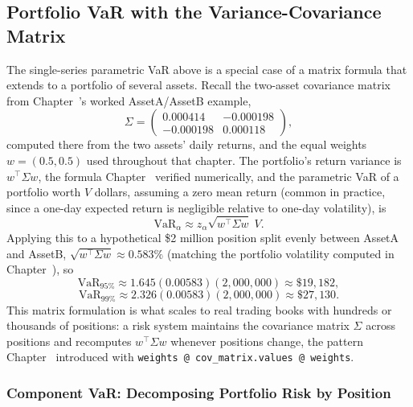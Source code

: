 \documentclass[../ai_in_finance]{subfiles}
\begin{document}
\subsection{Portfolio VaR with the Variance-Covariance Matrix}
\label{sec:matrix-var}

The single-series parametric VaR above is a special case of a matrix formula that extends to a portfolio of several assets. Recall the two-asset covariance matrix from Chapter~'s worked AssetA/AssetB example,
\begin{equation*}
\Sigma = \begin{pmatrix} 0.000414 & -0.000198 \\ -0.000198 & 0.000118 \end{pmatrix},
\end{equation*}
computed there from the two assets' daily returns, and the equal weights $w = (0.5, 0.5)$ used throughout that chapter. The portfolio's return variance is $w^\top \Sigma w$, the formula Chapter~ verified numerically, and the parametric VaR of a portfolio worth $V$ dollars, assuming a zero mean return (common in practice, since a one-day expected return is negligible relative to one-day volatility), is
\begin{equation}
\label{eq:marketrisk-portfolio-var}
\text{VaR}_\alpha \approx z_\alpha \sqrt{w^\top \Sigma w}\; V.
\end{equation}
Applying this to a hypothetical \$2 million position split evenly between AssetA and AssetB, $\sqrt{w^\top \Sigma w} \approx 0.583\%$ (matching the portfolio volatility computed in Chapter~), so
\begin{equation*}
\text{VaR}_{95\%} \approx 1.645(0.00583)(2{,}000{,}000) \approx \$19{,}182,
\end{equation*}
\begin{equation*}
\text{VaR}_{99\%} \approx 2.326(0.00583)(2{,}000{,}000) \approx \$27{,}130.
\end{equation*}
This matrix formulation is what scales to real trading books with hundreds or thousands of positions: a risk system maintains the covariance matrix $\Sigma$ across positions and recomputes $w^\top \Sigma w$ whenever positions change, the pattern Chapter~ introduced with \texttt{weights @ cov\_matrix.values @ weights}.

\subsubsection*{Component VaR: Decomposing Portfolio Risk by Position}
\end{document}
